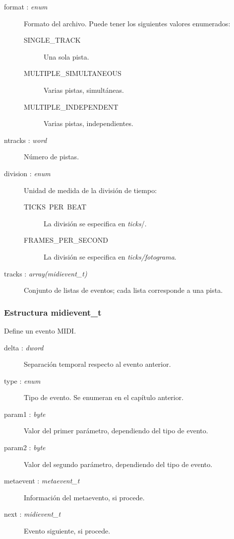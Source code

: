 \begin{description}
	\item[format : \textit{enum}] Formato del archivo. Puede tener los siguientes valores enumerados:
	
	\begin{description}
		\item[SINGLE\_TRACK] Una sola pista.
		\item[MULTIPLE\_SIMULTANEOUS] Varias pistas, simultáneas.
		\item[MULTIPLE\_INDEPENDENT] Varias pistas, independientes.
	\end{description}
	
	\item[ntracks : \textit{word}] Número de pistas.
	
	\item[division : \textit{enum}] Unidad de medida de la división de tiempo:
	
	\begin{description}
		\item[TICKS\ PER\ BEAT] La división se especifica en \textit{ticks}/\quarternote.
		\item[FRAMES\_PER\_SECOND] La división se especifica en \textit{ticks/fotograma}.
	\end{description}
	
	\item[tracks : \textit{array(midievent\_t)}] Conjunto de listas de eventos; cada lista corresponde a una pista.

\end{description}

\subsubsection{Estructura midievent\_t}

Define un evento MIDI.

\begin{description}
	\item[delta : \textit{dword}] Separación temporal respecto al evento anterior.
	\item[type : \textit{enum}] Tipo de evento. Se enumeran en el capítulo anterior.
	\item[param1 : \textit{byte}] Valor del primer parámetro, dependiendo del tipo de evento.
	\item[param2 : \textit{byte}] Valor del segundo parámetro, dependiendo del tipo de evento.
	\item[metaevent : \textit{metaevent\_t}] Información del metaevento, si procede.
	\item[next : \textit{midievent\_t}] Evento siguiente, si procede.
\end{description}

